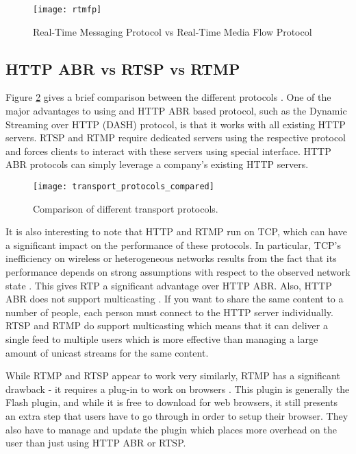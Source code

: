 \documentclass[12pt]{article}
\begin{document}
\begin{figure}[htp]
  \begin{center}
    \texttt{[image: rtmfp]}
    \caption{Real-Time Messaging Protocol vs Real-Time Media Flow Protocol}
    \label{fig:rtmfp}
  \end{center}
\end{figure}

\subsection{HTTP ABR vs RTSP vs RTMP}
Figure \ref{fig:transport_protocols_compared} gives a brief comparison between the different protocols \cite{transport_protocols}.  One of the major advantages to using and HTTP ABR based protocol, such as the Dynamic Streaming over HTTP (DASH) protocol, is that it works with all existing HTTP servers.  RTSP and RTMP require dedicated servers using the respective protocol and forces clients to interact with these servers using  special interface.  HTTP ABR protocols can simply leverage a company's existing HTTP servers.

\begin{figure}[htp]
  \begin{center}
    \texttt{[image: transport\_protocols\_compared]}
    \caption{Comparison of different transport protocols.}
    \label{fig:transport_protocols_compared}
  \end{center}
\end{figure}


It is also interesting to note that HTTP and RTMP run on TCP, which can have a significant impact on the performance of these protocols.  In particular, TCP’s inefficiency on wireless or heterogeneous networks results from the fact that its performance depends on strong assumptions with respect to the observed network state \cite{6336461}.  This gives RTP a significant advantage over HTTP ABR.  Also, HTTP ABR does not support multicasting \cite{7346220120120201}.  If you want to share the same content to a number of people, each person must connect to the HTTP server individually.  RTSP and RTMP do support multicasting which means that it can deliver a single feed to multiple users which is more effective than managing a large amount of unicast streams for the same content.

While RTMP and RTSP appear to work very similarly, RTMP has a significant drawback - it requires a plug-in to work on browsers \cite{7346220120120201}.
This plugin is generally the Flash plugin, and while it is free to download for web browsers, it still presents an extra step that users have to go through in order to setup their browser.  They also have to manage and update the plugin which places more overhead on the user than just using HTTP ABR or RTSP.
\end{document}
